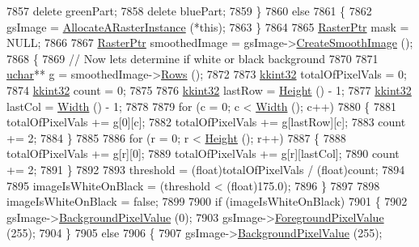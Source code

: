 \begin{DoxyCode}
7857     \textcolor{keyword}{delete}  greenPart;
7858     \textcolor{keyword}{delete}  bluePart;
7859   \}
7860   \textcolor{keywordflow}{else}
7861   \{
7862     gsImage = \hyperlink{class_k_k_b_1_1_raster_aa879980d112c01cb7ad9a3cfc7cd6f64}{AllocateARasterInstance} (*\textcolor{keyword}{this});
7863   \}
7864 
7865   \hyperlink{class_k_k_b_1_1_raster}{RasterPtr}  mask = NULL;
7866 
7867   \hyperlink{class_k_k_b_1_1_raster}{RasterPtr}  smoothedImage = gsImage->\hyperlink{class_k_k_b_1_1_raster_a7cc2985980e4679bd1ce1283da0bd9a3}{CreateSmoothImage} ();
7868   \{
7869     \textcolor{comment}{// Now lets determine if white or black background}
7870  
7871     \hyperlink{namespace_k_k_b_ace9969169bf514f9ee6185186949cdf7}{uchar}**  g = smoothedImage->\hyperlink{class_k_k_b_1_1_raster_a2460989f656e5222d6074cd0ba85ed72}{Rows} ();
7872 
7873     \hyperlink{namespace_k_k_b_a8fa4952cc84fda1de4bec1fbdd8d5b1b}{kkint32}  totalOfPixelVals = 0;
7874     \hyperlink{namespace_k_k_b_a8fa4952cc84fda1de4bec1fbdd8d5b1b}{kkint32}  count = 0;
7875  
7876     \hyperlink{namespace_k_k_b_a8fa4952cc84fda1de4bec1fbdd8d5b1b}{kkint32}  lastRow = \hyperlink{class_k_k_b_1_1_raster_af8d10d15697d5b92fb9595c48b529feb}{Height} () - 1;
7877     \hyperlink{namespace_k_k_b_a8fa4952cc84fda1de4bec1fbdd8d5b1b}{kkint32}  lastCol = \hyperlink{class_k_k_b_1_1_raster_aa2780c0b7ae75b7b595f99329689c1f6}{Width} () - 1;
7878 
7879     \textcolor{keywordflow}{for}  (c = 0;  c < \hyperlink{class_k_k_b_1_1_raster_aa2780c0b7ae75b7b595f99329689c1f6}{Width} ();  c++)
7880     \{
7881       totalOfPixelVals += g[0][c];
7882       totalOfPixelVals += g[lastRow][c];
7883       count += 2;
7884     \}
7885 
7886     \textcolor{keywordflow}{for}  (r = 0;  r < \hyperlink{class_k_k_b_1_1_raster_af8d10d15697d5b92fb9595c48b529feb}{Height} ();  r++)
7887     \{
7888       totalOfPixelVals += g[r][0];
7889       totalOfPixelVals += g[r][lastCol];
7890       count += 2;
7891     \}
7892 
7893     threshold = (float)totalOfPixelVals / (\textcolor{keywordtype}{float})count;
7894 
7895     imageIsWhiteOnBlack = (threshold < (float)175.0);
7896   \}
7897 
7898   imageIsWhiteOnBlack = \textcolor{keyword}{false};
7899 
7900   \textcolor{keywordflow}{if}  (imageIsWhiteOnBlack)
7901   \{
7902     gsImage->\hyperlink{class_k_k_b_1_1_raster_a823cb64d8d4c82620d16564e13855e75}{BackgroundPixelValue} (0);
7903     gsImage->\hyperlink{class_k_k_b_1_1_raster_a11b142b955f79a1482606a32ce209373}{ForegroundPixelValue} (255);
7904   \}
7905   \textcolor{keywordflow}{else}
7906   \{
7907     gsImage->\hyperlink{class_k_k_b_1_1_raster_a823cb64d8d4c82620d16564e13855e75}{BackgroundPixelValue} (255);

\end{DoxyCode}
